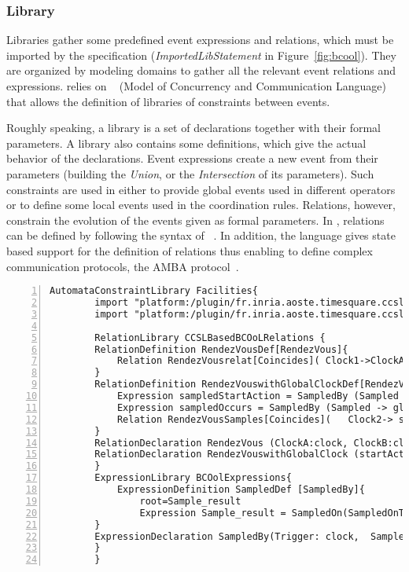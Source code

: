 \subsubsection{Library}
\label{subsec:bcoollib}

Libraries gather some predefined event expressions and relations, which must be imported by the specification (\emph{ImportedLibStatement} in Figure~\ref{fig:bcool}). They are organized by modeling domains to gather all the relevant event relations and expressions. \bcool relies on \moccml~\cite{moccmlbib} (Model of Concurrency and Communication Language) that allows the definition of libraries of constraints between events.

Roughly speaking, a \moccml library is a set of declarations together with their formal parameters. A library also contains some definitions, which give the actual behavior of the declarations. Event expressions create a new event from their parameters (\eg building the \textit{Union}, or the \textit{Intersection} of its parameters). Such constraints are used in \bcool either to provide global events used in different operators or to define some local events used in the coordination rules. Relations, however, constrain the evolution of the events given as formal parameters. In \moccml, relations can be defined by following the syntax of \ccsl~\cite{ccslbib}. In addition, the language gives state based support for the definition of relations thus enabling to define complex communication protocols, \eg the AMBA protocol~\cite{ambabus}.



\begin{lstlisting}[language=moccml,
		caption={Facilities Library in \moccml},
		label={lst:moccmllib}, 
		basicstyle=\scriptsize\ttfamily, backgroundcolor=\color{LGrey}, numbers=left, xleftmargin=2pt]
		AutomataConstraintLibrary Facilities{ 
		import "platform:/plugin/fr.inria.aoste.timesquare.ccslkernel.model/ccsllibrary/kernel.ccslLib" as kernel;
		import "platform:/plugin/fr.inria.aoste.timesquare.ccslkernel.model/ccsllibrary/CCSL.ccslLib" as CCSLLib;
		
		RelationLibrary CCSLBasedBCOoLRelations {
		RelationDefinition RendezVousDef[RendezVous]{ 
			Relation RendezVousrelat[Coincides]( Clock1->ClockA, Clock2->ClockB)
		}
		RelationDefinition RendezVouswithGlobalClockDef[RendezVouswithGlobalClock]{ 
			Expression sampledStartAction = SampledBy (Sampled -> globalClock, Trigger-> startAction)
			Expression sampledOccurs = SampledBy (Sampled -> globalClock, Trigger-> occurs)
			Relation RendezVousSamples[Coincides](   Clock2-> sampledStartAction , Clock1-> sampledOccurs  )
		}
		RelationDeclaration RendezVous (ClockA:clock, ClockB:clock) 
		RelationDeclaration RendezVouswithGlobalClock (startAction: clock , occurs: clock, globalClock: clock )
		}
		ExpressionLibrary BCOolExpressions{
			ExpressionDefinition SampledDef [SampledBy]{
				root=Sample_result 
				Expression Sample_result = SampledOn(SampledOnTrigger -> Trigger, SampledOnSampledClock ->Sampled)
		}
		ExpressionDeclaration SampledBy(Trigger: clock,  Sampled: clock):clock
		}	
		}
\end{lstlisting}

